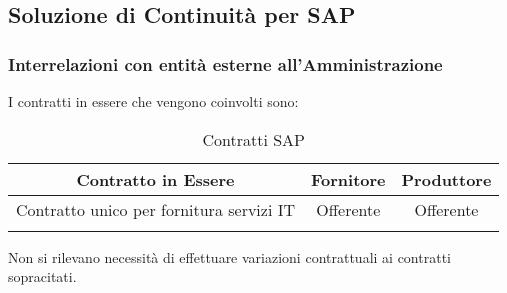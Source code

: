 \newpage
\subsection{Soluzione di Continuità per SAP}
\subsubsection{Interrelazioni con entità esterne all’Amministrazione}
I contratti in essere che vengono coinvolti sono:
\renewcommand \arraystretch{1,5}
\begin{longtable}{c c c}
\toprule
\textbf{Contratto in Essere} & \textbf{Fornitore} & \textbf{Produttore} \\
\toprule
	Contratto unico per fornitura servizi IT & Offerente & Offerente \\
\bottomrule
\caption{Contratti SAP}
\end{longtable}
Non si rilevano necessità di effettuare variazioni contrattuali ai contratti sopracitati.
